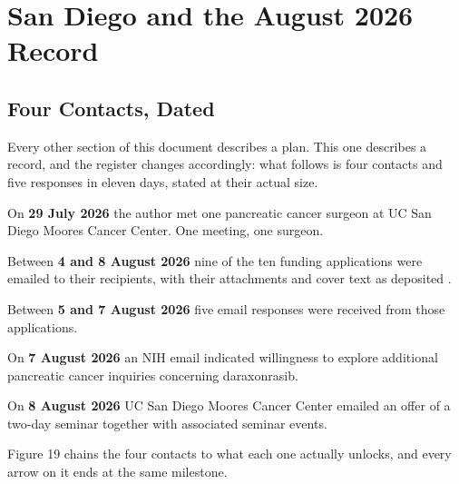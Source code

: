 \section{San Diego and the August 2026 Record}

\subsection{Four Contacts, Dated}

Every other section of this document describes a plan. This one describes a
record, and the register changes accordingly: what follows is four contacts and
five responses in eleven days, stated at their actual size.

On \textbf{29 July 2026} the author met one pancreatic cancer surgeon at UC San
Diego Moores Cancer Center. One meeting, one surgeon.

Between \textbf{4 and 8 August 2026} nine of the ten funding applications were
emailed to their recipients, with their attachments and cover text as deposited
\cite{tenapps2026}.

Between \textbf{5 and 7 August 2026} five email responses were received from
those applications.

On \textbf{7 August 2026} an NIH email indicated willingness to explore
additional pancreatic cancer inquiries concerning daraxonrasib.

On \textbf{8 August 2026} UC San Diego Moores Cancer Center emailed an offer of
a two-day seminar together with associated seminar events.

Figure 19 chains the four contacts to what each one actually unlocks, and every
arrow on it ends at the same milestone.

